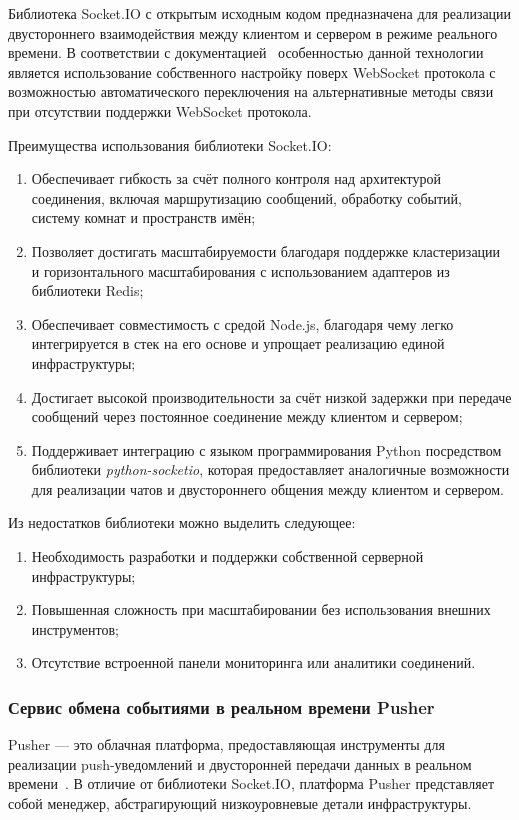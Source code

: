 Библиотека Socket.IO с открытым исходным кодом предназначена для реализации двустороннего взаимодействия между клиентом и сервером в режиме реального времени. В соответствии с документацией~\cite{socketio_docs} особенностью данной технологии является использование собственного настройку поверх WebSocket протокола с возможностью автоматического переключения на альтернативные методы связи при отсутствии поддержки WebSocket протокола.

Преимущества использования библиотеки Socket.IO:
\begin{enumerate}
  \item Обеспечивает гибкость за счёт полного контроля над архитектурой соединения, включая маршрутизацию сообщений, обработку событий, систему комнат и пространств имён;
  \item Позволяет достигать масштабируемости благодаря поддержке кластеризации и горизонтального масштабирования с использованием адаптеров из библиотеки Redis;
  \item Обеспечивает совместимость с средой Node.js, благодаря чему легко интегрируется в стек на его основе и упрощает реализацию единой инфраструктуры;
  \item Достигает высокой производительности за счёт низкой задержки при передаче сообщений через постоянное соединение между клиентом и сервером;
  \item Поддерживает интеграцию с языком программирования Python посредством библиотеки \textit{python-socketio}, которая предоставляет аналогичные возможности для реализации чатов и двустороннего общения между клиентом и сервером.
\end{enumerate}


Из недостатков библиотеки можно выделить следующее:
\begin{enumerate}
  \item Необходимость разработки и поддержки собственной серверной инфраструктуры;
  \item Повышенная сложность при масштабировании без использования внешних инструментов;
  \item Отсутствие встроенной панели мониторинга или аналитики соединений.
\end{enumerate}

\subsubsection*{Сервис обмена событиями в реальном времени Pusher}

Pusher — это облачная платформа, предоставляющая инструменты для реализации push-уведомлений и двусторонней передачи данных в реальном времени~\cite{pusher_docs}. В отличие от библиотеки Socket.IO, платформа Pusher представляет собой менеджер, абстрагирующий низкоуровневые детали инфраструктуры.

